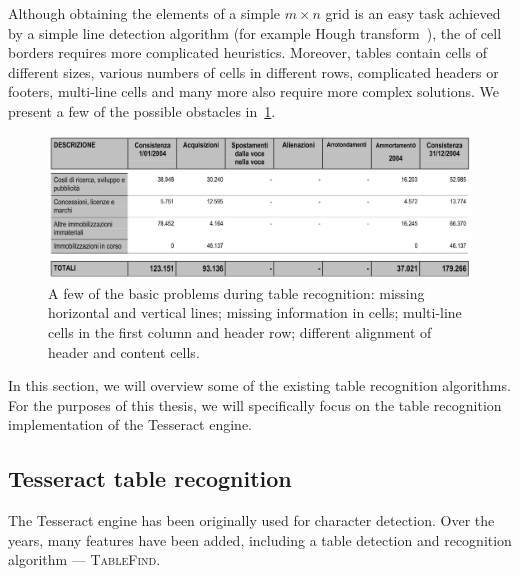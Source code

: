  Although obtaining the elements of a simple $m{\times}n$ grid is an easy task achieved by a simple line detection algorithm (for example Hough transform~\cite{houghTransform}), the  of cell borders requires more complicated heuristics. Moreover, tables contain cells of different sizes, various numbers of cells in different rows, complicated headers or footers, multi-line cells and many more also require more complex solutions. We present a few of the possible obstacles in~\cref{fig:tableRecognitionObstacles}.

\begin{figure}[t]
\centering
\includegraphics[width=0.7\linewidth]{img/tableDetection/recognitionProblematic.jpg}
\caption{A few of the basic problems during table recognition: missing horizontal and vertical lines; missing information in cells; multi-line cells in the first column and header row; different alignment of header and content cells.}
\label{fig:tableRecognitionObstacles}
\end{figure}

In this section, we will overview some of the  existing table recognition algorithms. For the purposes of this thesis, we will specifically focus on the table recognition implementation of the Tesseract engine.

\subsection{Tesseract table recognition} \label{tableFind}

The Tesseract engine has been originally used  for character detection. Over the years,  many features have been added, including a table detection and recognition algorithm --- \textsc{TableFind}. 

